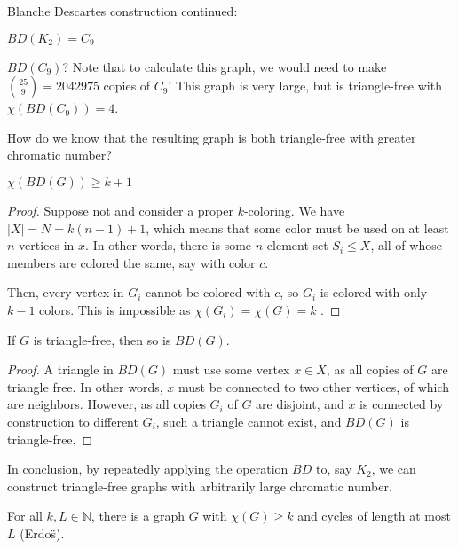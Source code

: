 
Blanche Descartes construction continued:

\begin{eg}
	\( BD(K_2) = C_9\)
\end{eg}

\begin{eg}
	\( BD(C_9) \)? Note that to calculate this graph, we would need to make \( \binom{25}{9} = 2042975 \) copies of \( C_9 \)! This graph is very large, but is triangle-free with \( \chi(BD(C_9)) = 4 \).
\end{eg}

How do we know that the resulting graph is both triangle-free with greater chromatic number?

\begin{lemma}
	\( \chi(BD(G)) \ge  k+1 \)
\end{lemma}
\begin{proof}
	Suppose not and consider a proper \( k \)-coloring. We have \( |X| = N = k(n-1) + 1 \), which means that some color must be used on at least \( n \) vertices in \( x \). In other words, there is some \( n \)-element set \( S_i \le  X \), all of whose members are colored the same, say with color \( c \). \par
	Then, every vertex in \( G_i \) cannot be colored with \( c \), so \( G_i \) is colored with only \( k - 1 \) colors. This is impossible as \( \chi(G_i) = \chi(G) = k \) \contra.
\end{proof}

\begin{lemma}
	If \( G \) is triangle-free, then so is \( BD(G) \).
\end{lemma}
\begin{proof}
	A triangle in \( BD(G) \) must use some vertex \( x \in X \), as all copies of \( G \) are triangle free. In other words, \( x \) must be connected to two other vertices, of which are neighbors. However, as all copies \( G_i \) of \( G \) are disjoint, and \( x \) is connected by construction to different \( G_i \), such a triangle cannot exist, and \( BD(G) \) is triangle-free.
\end{proof}

In conclusion, by repeatedly applying the operation \( BD \) to, say \( K_2 \), we can construct triangle-free graphs with arbitrarily large chromatic number.

\begin{theorem}
	For all \( k,L \in \mathbb{N}\), there is a graph \( G \) with \( \chi(G) \ge k \) and cycles of length at most \( L \) (Erdo\"s).
\end{theorem}

